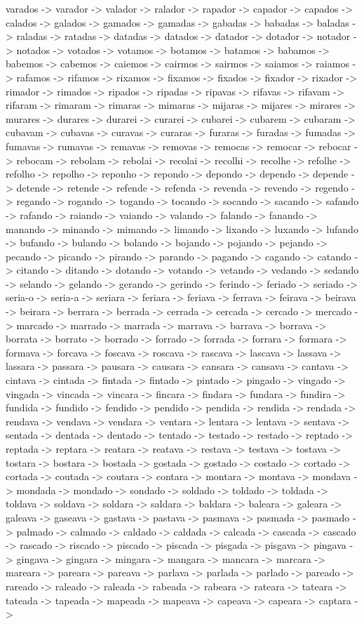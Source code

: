 \documentclass[a4paper,11pt]{article}
\begin{document}
varados -> varador -> valador -> ralador -> rapador -> capador -> capados -> calados -> galados -> gamados -> gamadas -> gabadas -> babadas -> baladas -> raladas -> ratadas -> datadas -> datados -> datador -> dotador -> notador -> notados -> votados -> votamos -> botamos -> batamos -> babamos -> babemos -> cabemos -> caiemos -> cairmos -> sairmos -> saiamos -> raiamos -> rafamos -> rifamos -> rixamos -> fixamos -> fixados -> fixador -> rixador -> rimador -> rimados -> ripados -> ripadas -> ripavas -> rifavas -> rifavam -> rifaram -> rimaram -> rimaras -> mimaras -> mijaras -> mijares -> mirares -> murares -> durares -> durarei -> curarei -> cubarei -> cubarem -> cubaram -> cubavam -> cubavas -> curavas -> curaras -> furaras -> furadas -> fumadas -> fumavas -> rumavas -> remavas -> removas -> remocas -> remocar -> rebocar -> rebocam -> rebolam -> rebolai -> recolai -> recolhi -> recolhe -> refolhe -> refolho -> repolho -> reponho -> repondo -> depondo -> dependo -> depende -> detende -> retende -> refende -> refenda -> revenda -> revendo -> regendo -> regando -> rogando -> togando -> tocando -> socando -> sacando -> safando -> rafando -> raiando -> vaiando -> valando -> falando -> fanando -> manando -> minando -> mimando -> limando -> lixando -> luxando -> lufando -> bufando -> bulando -> bolando -> bojando -> pojando -> pejando -> pecando -> picando -> pirando -> parando -> pagando -> cagando -> catando -> citando -> ditando -> dotando -> votando -> vetando -> vedando -> sedando -> selando -> gelando -> gerando -> gerindo -> ferindo -> feriado -> seriado -> seria-o -> seria-a -> seriara -> feriara -> feriava -> ferrava -> feirava -> beirava -> beirara -> berrara -> berrada -> cerrada -> cercada -> cercado -> mercado -> marcado -> marrado -> marrada -> marrava -> barrava -> borrava -> borrata -> borrato -> borrado -> forrado -> forrada -> forrara -> formara -> formava -> forcava -> foscava -> roscava -> rascava -> lascava -> lassava -> lassara -> passara -> pausara -> causara -> cansara -> cansava -> cantava -> cintava -> cintada -> fintada -> fintado -> pintado -> pingado -> vingado -> vingada -> vincada -> vincara -> fincara -> findara -> fundara -> fundira -> fundida -> fundido -> fendido -> pendido -> pendida -> rendida -> rendada -> rendava -> vendava -> vendara -> ventara -> lentara -> lentava -> sentava -> sentada -> dentada -> dentado -> tentado -> testado -> restado -> reptado -> reptada -> reptara -> reatara -> reatava -> restava -> testava -> tostava -> tostara -> bostara -> bostada -> gostada -> gostado -> costado -> cortado -> cortada -> coutada -> coutara -> contara -> montara -> montava -> mondava -> mondada -> mondado -> sondado -> soldado -> toldado -> toldada -> toldava -> soldava -> soldara -> saldara -> baldara -> baleara -> galeara -> galeava -> gaseava -> gastava -> pastava -> pasmava -> pasmada -> pasmado -> palmado -> calmado -> caldado -> caldada -> calcada -> cascada -> cascado -> rascado -> riscado -> piscado -> piscada -> pisgada -> pisgava -> pingava -> gingava -> gingara -> mingara -> mangara -> mancara -> marcara -> mareara -> pareara -> pareava -> parlava -> parlada -> parlado -> pareado -> rareado -> raleado -> raleada -> rabeada -> rabeara -> rateara -> tateara -> tateada -> tapeada -> mapeada -> mapeava -> capeava -> capeara -> captara -> 
\end{document}

